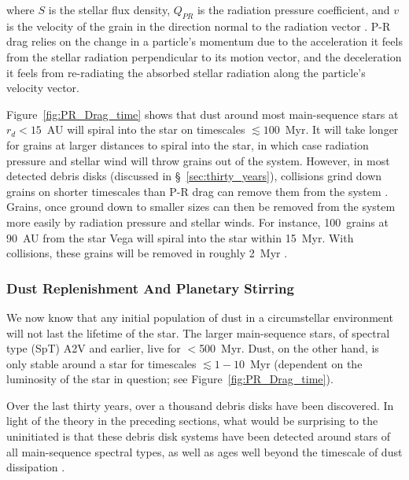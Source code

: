     \noindent where $S$ is the stellar flux density, $Q_{PR}$ is the radiation pressure coefficient, and $v$ is the velocity of the grain in the direction normal to the radiation vector \citep[i.e., orbital direction;][]{Burns1979}. P-R drag relies on the change in a particle's momentum due to the acceleration it feels from the stellar radiation perpendicular to its motion vector, and the deceleration it feels from re-radiating the absorbed stellar radiation along the particle's velocity vector.
    
    Figure~\ref{fig:PR_Drag_time} shows that dust around most main-sequence stars at $r_d<15$~AU will spiral into the star on timescales $\lesssim 100$~Myr. It will take longer for grains at larger distances to spiral into the star, in which case radiation pressure and stellar wind will throw grains out of the system. However, in most detected debris disks (discussed in \S~\ref{sec:thirty_years}), collisions grind down grains on shorter timescales than P-R drag can remove them from the system \citep[e.g.,][]{Wyatt2008}. Grains, once ground down to smaller sizes can then be removed from the system more easily by radiation pressure and stellar winds. For instance, 100\micron\  grains at 90~AU from the star Vega will spiral into the star within 15~Myr. With collisions, these grains will be removed in roughly 2~Myr \citep{Backman1993}. 
    
    \subsubsection{Dust Replenishment And Planetary Stirring}\label{sec:replenishment}
    
    We now know that any initial population of dust in a circumstellar environment will not last the lifetime of the star. The larger main-sequence stars, of spectral type (SpT) A2V and earlier, live for $<$500~Myr. Dust, on the other hand, is only stable around a star for timescales $\lesssim 1-10$~Myr (dependent on the luminosity of the star in question; see Figure~\ref{fig:PR_Drag_time}). 
    
    Over the last thirty years, over a thousand debris disks have been discovered. In light of the theory in the preceding sections, what would be surprising to the uninitiated is that these debris disk systems have been detected around stars of all main-sequence spectral types, as well as ages well beyond the timescale of dust dissipation \citep[see Figure~\ref{fig:24micron_evolution} and Figure 6 in][]{Wyatt2008}. 

